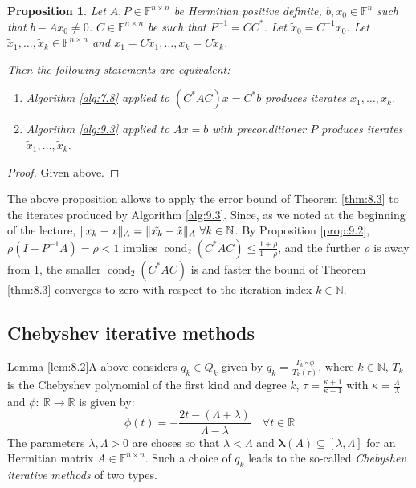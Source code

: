 \documentclass[12pt]{article}
\newcounter{lecture}
\newtheorem{proposition}[theorem]{Proposition}
\theoremstyle{definition}
\theoremstyle{remark}
\numberwithin{equation}{section}
\newcommand{\F}{\mathbb{F}}
\newcommand{\R}{\mathbb{R}}
\newcommand{\N}{\mathbb{N}}
\newcommand{\spectrum}[1]{\bm{\lambda}(#1)}
\DeclarePairedDelimiter{\norm}{\lVert}{\rVert}
\DeclareMathOperator{\cond}{cond}
\begin{document}
\begin{proposition}
  \label{prop:9.4}
  Let $A, P \in \F^{n\times n}$ be Hermitian positive definite, $b, x_0 \in \F^n$ such that $b - Ax_0 \neq 0$. $C \in \F^{n\times n}$ be such that $P^{-1} = CC^*$. Let $\tilde{x}_0 = C^{-1} x_0$. Let $\tilde{x}_1, \ldots, \tilde{x}_k \in \F^{n\times n}$ and $x_1 = C \tilde{x}_1, \ldots, x_k = C \tilde{x}_k$.

  Then the following statements are equivalent:
  \begin{enumerate}[label=(\roman*)]
    \item Algorithm \ref{alg:7.8} applied to $(C^* A C)x = C^* b$ produces iterates $x_1, \ldots, x_k$.
    \item Algorithm \ref{alg:9.3} applied to $Ax = b$ with preconditioner $P$ produces iterates $\tilde{x}_1, \ldots, \tilde{x}_k$.
  \end{enumerate}
\end{proposition}
\begin{proof}
  Given above.
\end{proof}
The above proposition allows to apply the error bound of Theorem \ref{thm:8.3} to the iterates produced by Algorithm \ref{alg:9.3}. Since, as we noted at the beginning of the lecture,
$\norm{x_k - x}_A = \norm{\tilde{x_k} - \tilde{x}}_A\ \forall k \in \N$. By Proposition \ref{prop:9.2}, $\rho(I - P^{-1} A) = \rho < 1$ implies $\cond_2(C^* A C) \leq \frac{1+\rho}{1-\rho}$, and the further $\rho$ is away from 1, the smaller $\cond_2(C^* A C)$ is and faster the bound of Theorem \ref{thm:8.3} converges to zero with respect to the iteration index $k \in \N$.

\subsection*{Chebyshev iterative methods}
Lemma \ref{lem:8.2}A above considers $q_k \in Q_k$ given by $q_k = \frac{T_k \circ \phi}{T_k(\tau)}$, where $k\in \N$, $T_k$ is the Chebyshev polynomial of the first kind and degree $k$, $\tau = \frac{\kappa +1}{\kappa - 1}$ with $\kappa = \frac{\Lambda}{\lambda}$ and $\phi:\ \R \rightarrow \R$ is given by:
\begin{equation*}
  \phi(t) = -\frac{2t - (\Lambda + \lambda)}{\Lambda - \lambda} \quad \forall t \in \R
\end{equation*}
The parameters $\lambda,\Lambda > 0$ are choses so that $\lambda < \Lambda$ and $\spectrum{A} \subseteq [\lambda, \Lambda]$ for an Hermitian matrix $A \in \F^{n\times n}$. Such a choice of $q_k$ leads to the so-called \emph{Chebyshev iterative methods} of two types.
\end{document}
